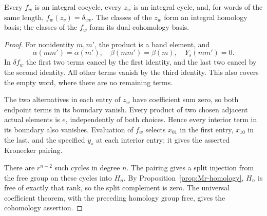 \begin{lemma}\label{lem:Mr-duality}
Every $f_w$ is an integral cocycle, every $z_w$ is an integral cycle,
and, for words of the same length,
$f_w(z_v)=\delta_{wv}$.  The classes of the $z_w$ form an integral
homology basis; the classes of the $f_w$ form its dual cohomology basis.
\end{lemma}
\begin{proof}
For nonidentity $m,m'$, the product is a band element, and
\[
 \alpha(mm')=\alpha(m'),\quad
 \beta(mm')=\beta(m),\quad Y_s(mm')=0.
\]
In $\delta f_w$ the first two terms cancel by the first identity, and
the last two cancel by the second identity.  All other terms vanish by
the third identity.  This also covers the empty word, where there are
no remaining terms.

The two alternatives in each entry of $z_w$ have coefficient sum zero,
so both endpoint terms in its boundary vanish.  Every product of two
chosen adjacent actual elements is $e$, independently of both choices.
Hence every interior term in its boundary also vanishes.  Evaluation of
$f_w$ selects $x_{01}$ in the first entry, $x_{10}$ in the last, and the
specified $y_s$ at each interior entry; it gives the asserted Kronecker
pairing.

There are $r^{n-2}$ such cycles in degree $n$.  The pairing gives a split
injection from the free group on these cycles into $H_n$.  By
Proposition~\ref{prop:Mr-homology}, $H_n$ is free of exactly that rank,
so the split complement is zero.  The universal coefficient theorem,
with the preceding homology group free, gives the cohomology assertion.
\end{proof}

